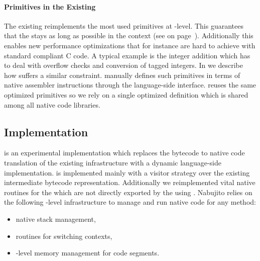 \paragraph{Primitives in the Existing \JIT}
The existing \JIT reimplements the most used primitives at \VM-level.
This guarantees that the \VM stays as long as possible in the \JIT context (see  on page~\pageref{sec:benzo-jit-interaction}).
Additionally this enables new performance optimizations that for instance are hard to achieve with standard compliant C code.
A typical example is the integer addition which has to deal with overflow checks and conversion of tagged integers.
In  we describe how \WF suffers a similar constraint.
\WF manually defines such primitives in terms of native assembler instructions through the language-side \B interface.
\NBJ reuses the same optimized primitives so we rely on a single optimized definition which is shared among all native code libraries.

\subsection{\NBJ Implementation}
\NBJ is an experimental \JIT implementation which replaces the bytecode to native code translation of the existing \JIT infrastructure with a dynamic language-side implementation.
\NBJ is implemented mainly with a visitor strategy over the existing intermediate bytecode representation. 
Additionally we reimplemented vital native routines for the \JIT which are not directly exported by the \VM using \B. 
Nabujito relies on the following \VM-level infrastructure to manage and run native code for any \PH method:

\begin{itemize}[noitemsep,nolistsep]
	\item native stack management,
	\item routines for switching contexts,
	\item \JIT-level memory management for code segments.
\end{itemize}


